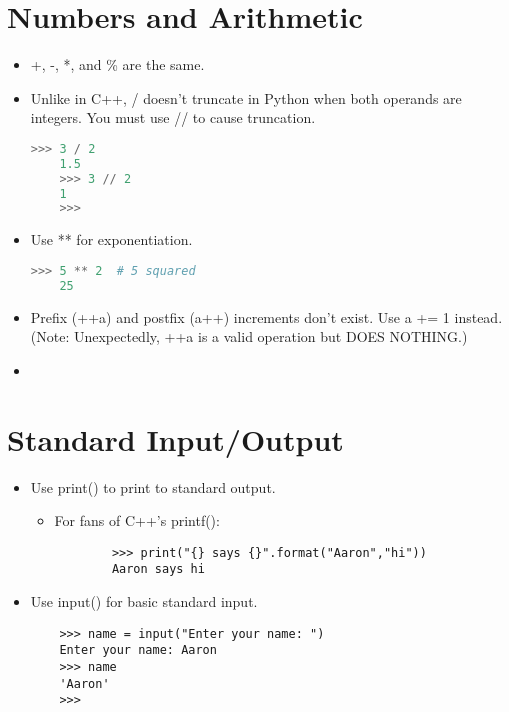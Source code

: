 \documentclass{article}
\begin{document}
\section{Numbers and Arithmetic}
\begin{itemize}
    \item +, -, *, and \% are the same.
    \item Unlike in C++, / doesn't truncate in Python when both operands are integers. You must use // to cause truncation.
    \begin{lstlisting}[language=Python]
    >>> 3 / 2
    1.5
    >>> 3 // 2
    1
    >>> 
    \end{lstlisting}
    \item Use ** for exponentiation.
    \begin{lstlisting}[language=Python]
    >>> 5 ** 2  # 5 squared
    25
    \end{lstlisting}
    \item Prefix (++a) and postfix (a++) increments don't exist. Use a += 1 instead. (Note: Unexpectedly, ++a is a valid operation but DOES NOTHING.) 
    \item 

\end{itemize}

\section{Standard Input/Output}
\begin{itemize}
    \item Use print() to print to standard output.
        \begin{itemize}
        \item For fans of C++'s printf():
        \begin{lstlisting}
        >>> print("{} says {}".format("Aaron","hi"))
        Aaron says hi
        \end{lstlisting}
        \end{itemize}
    \item Use input() for basic standard input.
    \begin{lstlisting}
    >>> name = input("Enter your name: ")
    Enter your name: Aaron
    >>> name
    'Aaron'
    >>> 
    \end{lstlisting}
\end{itemize}
\end{document}
